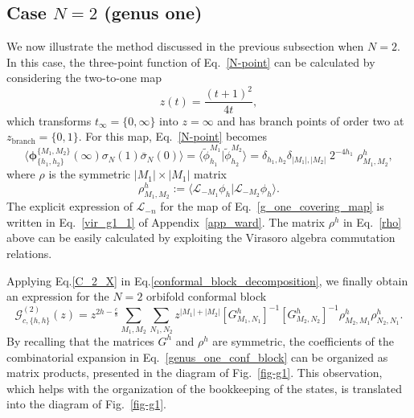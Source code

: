 \documentclass[a4paper,11pt]{article}
\begin{document}
\subsection{Case $N=2$ (genus one)}\label{sec:genus_one}

We now illustrate the method discussed in the previous subsection when $N=2$. 
In this case, the three-point function of Eq.~\eqref{N-point} can be calculated
by considering the two-to-one map
\begin{equation}\label{g_one_covering_map}
 z(t)=\frac{(t+1)^2}{4t},
\end{equation}
which transforms $t_{\infty}=\{0,\infty\}$ into $z=\infty$ and has branch points of 
order two at $z_{\text{branch}}=\{0, 1\}$. For this map, Eq.~\eqref{N-point} becomes
\begin{equation}\label{C_2_X}
 \langle \boldsymbol{\phi}^{\{M_1,M_2\}}_{\{h_1,h_2\}}(\infty) \sigma_{N}(1)\bar{\sigma}_{N}(0)\rangle=\langle \tilde{\phi}_{h_1}^{M_1} | \tilde{\phi}_{h_2}^{M_2}\rangle=
 \delta_{h_1, h_2}\delta_{|M_1|,|M_2|}\;2^{-4 h_1} \;\rho^h_{M_1,M_2},
\end{equation}
where $\rho$ is the symmetric $|M_1|\times|M_1|$ matrix
\begin{equation}
\label{rho}
 \rho^h_{M_1,M_2}:=\langle \mathcal{L}_{-M_1}\phi_{h}|\mathcal{L}_{-M_2}\phi_{h}\rangle.
\end{equation}
The explicit expression of $\mathcal{L}_{-n}$ for the map of Eq.~\eqref{g_one_covering_map}
is written in Eq.~\eqref{vir_g1_1} of Appendix~\ref{app_ward}. The matrix $\rho^h$ in Eq.~\eqref{rho} 
above can be easily calculated by exploiting the Virasoro algebra commutation relations.

Applying Eq.\eqref{C_2_X} in Eq.\eqref{conformal_block_decomposition}, we finally obtain an 
expression for the $N=2$ orbifold conformal block
\begin{equation}\label{genus_one_conf_block}
 \mathcal{G}_{c, \{h,h\}}^{(2)}(z)=z^{2h-\frac{c}{8}}\sum_{M_1, M_2}\sum_{N_1, N_2}
 z^{|M_1|+|M_2|}[G^{h}_{M_1,N_1}]^{-1}[G^{h}_{ M_2,N_2}]^{-1}
 \rho^h_{M_2,M_1}\rho^h_{N_2,N_1}.
\end{equation}
By recalling that the matrices $G^h$ and $\rho^h$ are symmetric, the coefficients of the combinatorial 
expansion in Eq.~\eqref{genus_one_conf_block} can be organized as matrix products, presented in the diagram 
of Fig.~\ref{fig-g1}. This observation, which helps with the organization of the bookkeeping of the states, 
is translated into the diagram of Fig.~\ref{fig-g1}.
\end{document}
